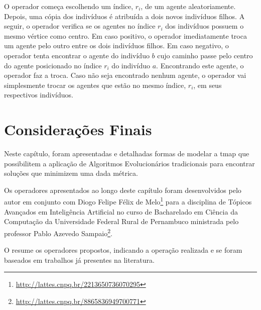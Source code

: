 O operador começa escolhendo um índice, $r_{i}$, de um agente aleatoriamente. 
Depois, uma cópia dos indivíduos é atribuída a dois novos indivíduos filhos. 
A seguir, o operador verifica se os agentes no índice $r_{i}$ dos indivíduos 
possuem o mesmo vértice como centro. Em caso positivo, o operador imediatamente 
troca um agente pelo outro entre os dois indivíduos filhos. Em caso negativo, o 
operador tenta encontrar o agente do indivíduo $b$ cujo caminho passe pelo 
centro do agente posicionado no índice $r_{i}$ do indivíduo $a$. Encontrando 
este agente, o operador faz a troca. Caso não seja encontrado nenhum agente, o 
operador vai simplesmente trocar os agentes que estão no mesmo índice, $r_{i}$, 
em seus respectivos indivíduos.

\section{Considerações Finais}

Neste capítulo, foram apresentadas e detalhadas formas de modelar a \ac{tmap} 
que possibilitem a aplicação de Algoritmos Evolucionários tradicionais para 
encontrar soluções que minimizem uma dada métrica.

Os operadores apresentados ao longo deste capítulo foram desenvolvidos pelo 
autor em conjunto com Diogo Felipe Félix de 
Melo\footnote{\url{http://lattes.cnpq.br/2213650736070295}} para a disciplina 
de Tópicos Avançados em Inteligência Artificial no curso de Bacharelado em 
Ciência da Computação da Universidade Federal Rural de Pernambuco ministrada 
pelo professor Pablo Azevedo 
Sampaio\footnote{\url{http://lattes.cnpq.br/8865836949700771}}.

 O  resume os operadores propostos, indicando a 
 operação realizada e se foram baseados em trabalhos já presentes na literatura.

